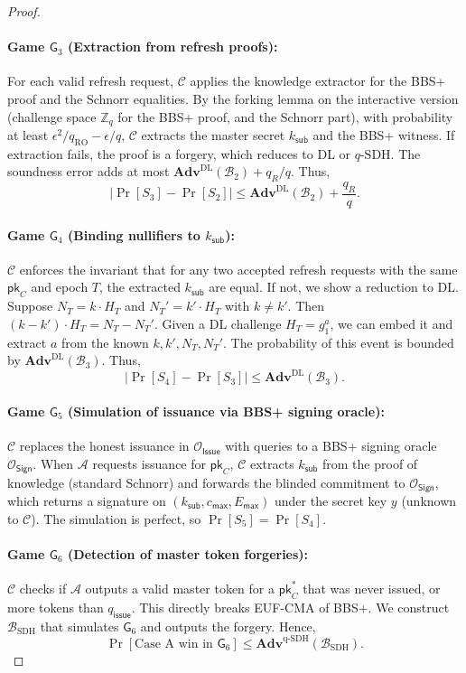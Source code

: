 \documentclass[11pt]{article}
\theoremstyle{definitionstyle}
\theoremstyle{plain}
\newcommand{\advantage}[1]{\mathbf{Adv}^{\mathrm{#1}}}
\begin{document}
\begin{proof}
\paragraph{Game $\mathsf{G}_3$ (Extraction from refresh proofs):} For each valid refresh request, $\mathcal{C}$ applies the knowledge extractor for the BBS+ proof and the Schnorr equalities. By the forking lemma on the interactive version (challenge space $\mathbb{Z}_q$ for the BBS+ proof, and the Schnorr part), with probability at least $\epsilon^2/q_{\text{RO}} - \epsilon/q$, $\mathcal{C}$ extracts the master secret $k_{\mathsf{sub}}$ and the BBS+ witness. If extraction fails, the proof is a forgery, which reduces to DL or $q$-SDH. The soundness error adds at most $\advantage{DL}(\mathcal{B}_2) + q_R/q$. Thus,
\[
|\Pr[S_3] - \Pr[S_2]| \le \advantage{DL}(\mathcal{B}_2) + \frac{q_R}{q}.
\]

\paragraph{Game $\mathsf{G}_4$ (Binding nullifiers to $k_{\mathsf{sub}}$):} $\mathcal{C}$ enforces the invariant that for any two accepted refresh requests with the same $\mathsf{pk}_C$ and epoch $T$, the extracted $k_{\mathsf{sub}}$ are equal. If not, we show a reduction to DL. Suppose $N_T = k \cdot H_T$ and $N_T' = k' \cdot H_T$ with $k \neq k'$. Then $(k - k') \cdot H_T = N_T - N_T'$. Given a DL challenge $H_T = g_1^a$, we can embed it and extract $a$ from the known $k,k',N_T,N_T'$. The probability of this event is bounded by $\advantage{DL}(\mathcal{B}_3)$. Thus,
\[
|\Pr[S_4] - \Pr[S_3]| \le \advantage{DL}(\mathcal{B}_3).
\]

\paragraph{Game $\mathsf{G}_5$ (Simulation of issuance via BBS+ signing oracle):} $\mathcal{C}$ replaces the honest issuance in $\mathcal{O}_{\mathsf{Issue}}$ with queries to a BBS+ signing oracle $\mathcal{O}_{\mathsf{Sign}}$. When $\mathcal{A}$ requests issuance for $\mathsf{pk}_C$, $\mathcal{C}$ extracts $k_{\mathsf{sub}}$ from the proof of knowledge (standard Schnorr) and forwards the blinded commitment to $\mathcal{O}_{\mathsf{Sign}}$, which returns a signature on $(k_{\mathsf{sub}}, c_{\mathsf{max}}, E_{\mathsf{max}})$ under the secret key $y$ (unknown to $\mathcal{C}$). The simulation is perfect, so $\Pr[S_5] = \Pr[S_4]$.

\paragraph{Game $\mathsf{G}_6$ (Detection of master token forgeries):} $\mathcal{C}$ checks if $\mathcal{A}$ outputs a valid master token for a $\mathsf{pk}_C^*$ that was never issued, or more tokens than $q_{\mathsf{issue}}$. This directly breaks EUF-CMA of BBS+. We construct $\mathcal{B}_{\text{SDH}}$ that simulates $\mathsf{G}_6$ and outputs the forgery. Hence,
\[
\Pr[\text{Case A win in }\mathsf{G}_6] \le \advantage{q\text{-}SDH}(\mathcal{B}_{\text{SDH}}).
\]


\end{proof}
\end{document}
